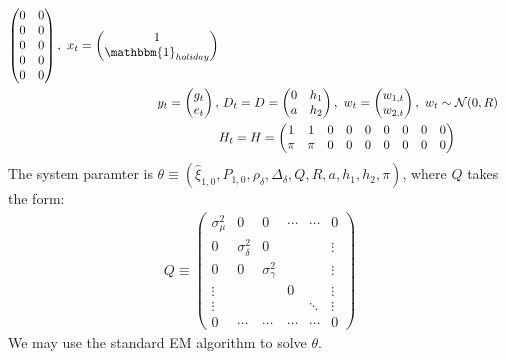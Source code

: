 \documentclass[12pt]{article}
\numberwithin{equation}{section}
\begin{document}
\begin{align*}
\begin{pmatrix}
        0 & 0 \\
        0 & 0 \\
        0 & 0 \\
        0 & 0 \\
        0 & 0 
    \end{pmatrix},
    \ 
    x_t = \begin{pmatrix}
        1 \\
        \mathbbm{1}_{holiday}
    \end{pmatrix} \\
    y_t = \begin{pmatrix}
        g_t \\
        e_t 
    \end{pmatrix},
    &\ 
    D_t = D = \begin{pmatrix}
        0 & h_1 \\
        a & h_2
    \end{pmatrix},
    \ 
    w_t = \begin{pmatrix}
        w_{1,t} \\
        w_{2,t}
    \end{pmatrix} 
    , \ w_t\sim\mathcal{N}(0,R) \\
    & H_t = H = \begin{pmatrix}
        1 & 1 & 0 & 0 & 0 & 0 & 0 & 0 & 0 \\
        \pi & \pi & 0 & 0 & 0 & 0 & 0 & 0 & 0
    \end{pmatrix}
\end{align*}
The system paramter is $\theta\equiv(\hat{\xi}_{1,0}, P_{1,0}, \rho_{\delta}, \Delta_{\delta}, Q, R, a, h_1, h_2, \pi)$, where $Q$ takes the form:
\begin{align*}
    Q \equiv \begin{pmatrix}
        \sigma_{\mu}^2 & 0 & 0 & \cdots & \cdots & 0 \\
        0 & \sigma_{\delta}^2 & 0 & & & \vdots \\
        0 & 0 & \sigma_{\gamma}^2 & & & \vdots \\
        \vdots & & & 0 & & \vdots \\
        \vdots & & & & \ddots & \vdots \\
        0 & \cdots & \cdots & \cdots & \cdots & 0
    \end{pmatrix}
\end{align*}
We may use the standard EM algorithm to solve $\theta$.

\printbibliography
\pagebreak
\appendix
\end{document}
